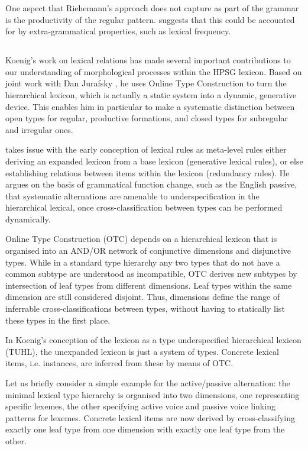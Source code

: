 One aspect that Riehemann's approach does not capture as part of the
grammar is the productivity of the regular
pattern. \citet{Riehemann98} suggests that this could be accounted for
by extra-grammatical properties, such as lexical frequency.

\subsection{\citet{Koenig99}}

Koenig's work on lexical relations has made several important
contributions to our understanding of morphological processes within
the HPSG lexicon. Based on joint work with Dan Jurafsky
\citep{Koenig94}, he uses Online Type Construction to turn the
hierarchical lexicon, which is actually a static system into a
dynamic, generative device. This enables him in particular to make a
systematic distinction between open types for regular, productive
formations, and closed types for subregular and irregular ones.

\citet{Koenig99} takes issue with the early conception of lexical
rules as meta-level rules either deriving an expanded lexicon from a
base lexicon (generative lexical rules), or else establishing
relations between items within the lexicon (redundancy rules). He
argues on the basis of grammatical function change, such as the
English passive, that systematic alternations are amenable to
underspecification in the hierarchical lexical,  once
cross-classification between types can be performed dynamically.

Online Type Construction (OTC) depends on a hierarchical lexicon that is
organised into an  AND/OR network of conjunctive dimensions and
disjunctive types. While in a standard type hierarchy any two types
that do not have a common subtype are understood as incompatible, OTC
derives new subtypes by intersection of leaf types from different
dimensions. Leaf types within the same dimension are still considered
disjoint. Thus, dimensions define the range of inferrable
cross-classifications between types, without having to statically list
these types in the first place.

In Koenig's conception of the lexicon as a type underspecified
hierarchical lexicon (TUHL), the unexpanded lexicon is just a system of
types. Concrete lexical items, i.e. instances, are inferred from these
by means of OTC. 

Let us briefly consider a simple example for the active/passive
alternation: the minimal lexical type hierarchy is organised into two
dimensions, one representing specific lexemes, the other specifying
active voice and passive voice linking patterns for lexemes. Concrete
lexical items are now derived by cross-classifying exactly one leaf
type from one dimension with exactly one leaf type from the other.

